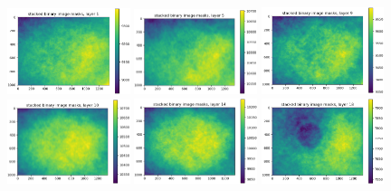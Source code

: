 \documentclass[letterpaper,11pt]{article}
\begin{document}
\begin{figure}[!ht]
\centering
\includegraphics[width=0.32\textwidth]{images/measuring_flatfield_corrections/mask_stack_layers_vectra/mask_stack_layer_1}
\includegraphics[width=0.32\textwidth]{images/measuring_flatfield_corrections/mask_stack_layers_vectra/mask_stack_layer_5}
\includegraphics[width=0.32\textwidth]{images/measuring_flatfield_corrections/mask_stack_layers_vectra/mask_stack_layer_9}
\includegraphics[width=0.32\textwidth]{images/measuring_flatfield_corrections/mask_stack_layers_vectra/mask_stack_layer_10}
\includegraphics[width=0.32\textwidth]{images/measuring_flatfield_corrections/mask_stack_layers_vectra/mask_stack_layer_14}
\includegraphics[width=0.32\textwidth]{images/measuring_flatfield_corrections/mask_stack_layers_vectra/mask_stack_layer_18}

\end{figure}
\end{document}
